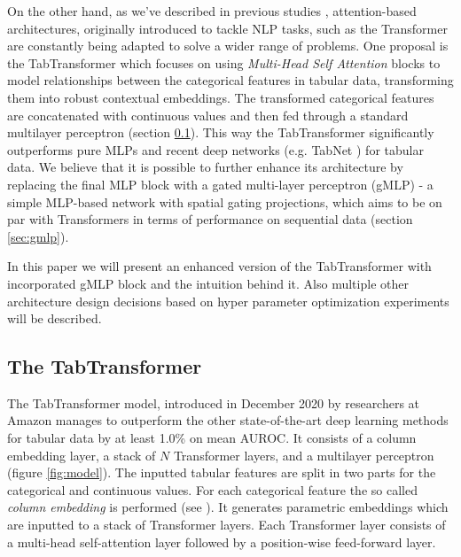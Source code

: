 \documentclass{article}
\begin{document}
On the other hand, as we've described in previous studies \cite{cholakov2021transformers}, attention-based architectures, originally introduced to tackle NLP tasks, such as the Transformer \cite{vaswani2017attention} are constantly being adapted to solve a wider range of problems. One proposal is the TabTransformer \cite{Huang2020TabTransformerTD} which focuses on using \textit{Multi-Head Self Attention} blocks to model relationships between the categorical features in tabular data, transforming them into robust contextual embeddings. The transformed categorical features are concatenated with continuous values and then fed through a standard multilayer perceptron \cite{haykin1994neural} (section \ref{sec:tabtransformer}). This way the TabTransformer significantly outperforms pure MLPs and recent deep networks (e.g. TabNet \cite{arik1908tabnet}) for tabular data. We believe that it is possible to further enhance its architecture by replacing the final MLP block with a gated multi-layer perceptron (gMLP) \cite{Liu2021PayAT} - a simple MLP-based network with spatial gating projections, which aims to be on par with Transformers in terms of performance on sequential data (section \ref{sec:gmlp}).

In this paper we will present an enhanced version of the TabTransformer with incorporated gMLP block and the intuition behind it. Also multiple other architecture design decisions based on hyper parameter optimization experiments will be described.

\subsection{The TabTransformer}
\label{sec:tabtransformer}

The TabTransformer model, introduced in December 2020 by researchers at Amazon manages to outperform the other state-of-the-art deep learning methods for tabular data by at least 1.0\% on mean AUROC. It consists of a column embedding layer, a stack of $N$ Transformer layers, and a multilayer perceptron (figure \ref{fig:model}). The inputted tabular features are split in two parts for the categorical and continuous values. For each categorical feature the so called \textit{column embedding} is performed (see \cite{Huang2020TabTransformerTD}). It generates parametric embeddings which are inputted to a stack of Transformer layers. Each Transformer layer \cite{vaswani2017attention} consists of a multi-head self-attention layer followed by a position-wise feed-forward layer.
\end{document}
